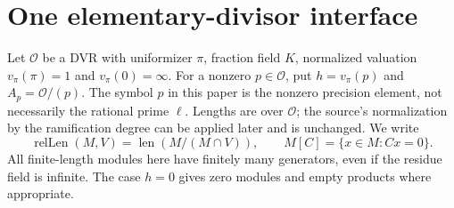 \documentclass[11pt]{article}
\newcommand{\Ocal}{\mathcal O}
\newcommand{\len}{\operatorname{len}}
\newcommand{\rl}{\operatorname{relLen}}
\newcommand{\val}{v_\pi}
\begin{document}
\section{One elementary-divisor interface}
Let $\Ocal$ be a DVR with uniformizer $\pi$, fraction field $K$, normalized valuation $\val(\pi)=1$ and $\val(0)=\infty$. For a nonzero $p\in\Ocal$, put $h=\val(p)$ and $A_p=\Ocal/(p)$. The symbol $p$ in this paper is the nonzero precision element, not necessarily the rational prime $\ell$. Lengths are over $\Ocal$; the source's normalization by the ramification degree can be applied later and is unchanged. We write
\[
 \rl(M,V)=\len(M/(M\cap V)),\qquad M[C]=\{x\in M:Cx=0\}.
\]
All finite-length modules here have finitely many generators, even if the residue field is infinite. The case $h=0$ gives zero modules and empty products where appropriate.
\end{document}
